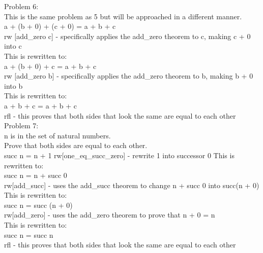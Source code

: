 \documentclass{article}
\theoremstyle{theorem}
\theoremstyle{definition}
\theoremstyle{remark}
\begin{document}
Problem 6: \\
This is the same problem as 5 but will be approached in a different manner. \\
a + (b + 0) + (c + 0) = a + b + c \\
rw [add\_zero c] - specifically applies the add\_zero theorem to c, making c + 0 into c \\
This is rewritten to: \\ 
a + (b + 0) + c = a + b + c \\
rw [add\_zero b] - specifically applies the add\_zero theorem to b, making b + 0 into b \\
This is rewritten to: \\ 
a + b + c = a + b + c \\
rfl - this proves that both sides that look the same are equal to each other \\

Problem 7: \\
n is in the set of natural numbers. \\
Prove that both sides are equal to each other. \\
succ n = n + 1
rw[one\_eq\_succ\_zero] - rewrite 1 into successor 0
This is rewritten to: \\ 
succ n = n + succ 0 \\
rw[add\_succ] - uses the add\_succ theorem to change n + succ 0 into succ(n + 0) \\
This is rewritten to: \\ 
succ n = succ (n + 0) \\
rw[add\_zero] - uses the add\_zero theorem to prove that n + 0 = n \\
This is rewritten to: \\ 
succ n = succ n \\
rfl - this proves that both sides that look the same are equal to each other \\
\end{document}
